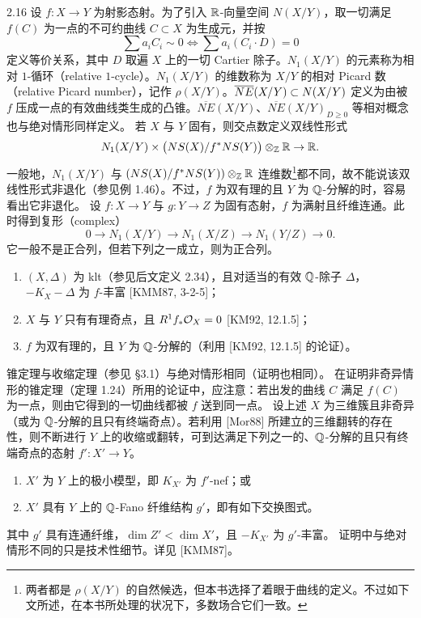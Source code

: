 \begin{example}[相对化]{2.16}
设 $f\colon X\to Y$ 为射影态射。为了引入 $\mathbb{R}$-向量空间 $N(X/Y)$，取一切满足 $f(C)$ 为一点的不可约曲线 $C\subset X$ 为生成元，并按
\[
\sum a_iC_i\sim0\iff\sum a_i(C_i\cdot D)=0
\]
定义等价关系，其中 $D$ 取遍 $X$ 上的一切 Cartier 除子。$N_1(X/Y)$ 的元素称为相对 $1$-循环（relative $1$-cycle）。$N_1(X/Y)$ 的维数称为 $X/Y$ 的相对 Picard 数（relative Picard number），记作 $\rho(X/Y)$。$\overline{NE}(X/Y)\subset N(X/Y)$ 定义为由被 $f$ 压成一点的有效曲线类生成的凸锥。$\overline{NE}(X/Y)$、$\overline{NE}(X/Y)_{D\ge0}$ 等相对概念也与绝对情形同样定义。
若 $X$ 与 $Y$ 固有，则交点数定义双线性形式
\[
N_1(X/Y)\times\bigl(NS(X)/f^*NS(Y)\bigr)\otimes_{\mathbb{Z}}\mathbb{R}\to\mathbb{R}.
\]
一般地，$N_1(X/Y)$ 与 $(NS(X)/f^*NS(Y))\otimes_{\mathbb{Z}}\mathbb{R}$ 连维数\footnote{两者都是 $\rho(X/Y)$ 的自然候选，但本书选择了着眼于曲线的定义。不过如下文所述，在本书所处理的状况下，多数场合它们一致。}都不同，故不能说该双线性形式非退化（参见例 1.46）。不过，$f$ 为双有理的且 $Y$ 为 $\mathbb{Q}$-分解的时，容易看出它非退化。
设 $f\colon X\to Y$ 与 $g\colon Y\to Z$ 为固有态射，$f$ 为满射且纤维连通。此时得到复形（complex）
\[
0\to N_1(X/Y)\to N_1(X/Z)\to N_1(Y/Z)\to 0.
\]
它一般不是正合列，但若下列之一成立，则为正合列。
\begin{enumerate}[label=（\arabic*）,leftmargin=2.6em,itemsep=1pt]
\item $(X,\Delta)$ 为 klt（参见后文定义 2.34），且对适当的有效 $\mathbb{Q}$-除子 $\Delta$，$-K_X-\Delta$ 为 $f$-丰富 [KMM87, 3-2-5]；
\item $X$ 与 $Y$ 只有有理奇点，且 $R^1f_*\mathcal{O}_X=0$ [KM92, 12.1.5]；
\item $f$ 为双有理的，且 $Y$ 为 $\mathbb{Q}$-分解的（利用 [KM92, 12.1.5] 的论证）。
\end{enumerate}
锥定理与收缩定理（参见 §3.1）与绝对情形相同（证明也相同）。
在证明非奇异情形的锥定理（定理 1.24）所用的论证中，应注意：若出发的曲线 $C$ 满足 $f(C)$ 为一点，则由它得到的一切曲线都被 $f$ 送到同一点。
设上述 $X$ 为三维簇且非奇异（或为 $\mathbb{Q}$-分解的且只有终端奇点）。若利用 [Mor88] 所建立的三维翻转的存在性，则不断进行 $Y$ 上的收缩或翻转，可到达满足下列之一的、$\mathbb{Q}$-分解的且只有终端奇点的态射 $f'\colon X'\to Y$。
\begin{enumerate}[label=（\arabic*）,leftmargin=2.6em,itemsep=1pt]
\item $X'$ 为 $Y$ 上的极小模型，即 $K_{X'}$ 为 $f'$-nef；或
\item $X'$ 具有 $Y$ 上的 $\mathbb{Q}$-Fano 纤维结构 $g'$，即有如下交换图式。
\end{enumerate}
\begin{center}
\end{center}
其中 $g'$ 具有连通纤维，$\dim Z'<\dim X'$，且 $-K_{X'}$ 为 $g'$-丰富。
证明中与绝对情形不同的只是技术性细节。详见 [KMM87]。
\end{example}

